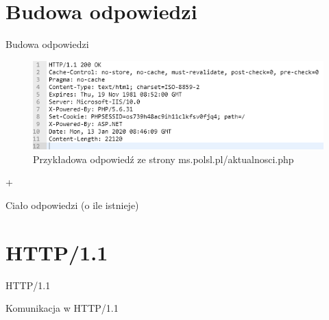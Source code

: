 \documentclass{beamer}
\begin{document}
\section{Budowa odpowiedzi}
\begin{frame}{Budowa odpowiedzi}
    \begin{figure}[request]
        \caption{Przykładowa odpowiedź ze strony ms.polsl.pl/aktualnosci.php}
        \centering
        \includegraphics[width=\textwidth]{images/response.png}
    \end{figure}
    \vspace{1pt}
    \begin{center}
        \begin{Huge}
            +
        \end{Huge}
    \end{center}
    \begin{center}
        Ciało odpowiedzi (o ile istnieje)
    \end{center}
\end{frame}

\section{HTTP/1.1}
\begin{frame}{HTTP/1.1}
    \begin{center}
        \begin{Huge}
           Komunikacja w HTTP/1.1
        \end{Huge}
    \end{center}
\end{frame}
\end{document}
